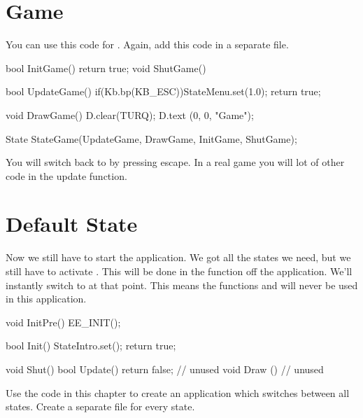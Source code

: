 \section{Game}
You can use this code for . Again, add this code in a separate file.
\begin{code}
bool InitGame() {return true;}
void ShutGame() {}

bool UpdateGame()
{
   if(Kb.bp(KB_ESC))StateMenu.set(1.0);
   return true;
}

void DrawGame()
{
   D.clear(TURQ);
   D.text (0, 0, "Game");
}

State StateGame(UpdateGame, DrawGame, InitGame, ShutGame);
\end{code}

You will switch back to  by pressing escape. In a real game you will lot of other code in the update function.

\section{Default State}
Now we still have to start the application. We got all the states we need, but we still have to activate . This will be done in the  function off the application. We'll instantly switch to  at that point. This means the functions  and  will never be used in this application.

\begin{code}
void InitPre()
{
   EE_INIT();
}

bool Init()
{
   StateIntro.set();
   return true;
}

void Shut() {}
bool Update() {return false;} // unused
void Draw  () {             } // unused
\end{code}

\begin{exercise}
Use the code in this chapter to create an application which switches between all states. Create a separate file for every state.
\end{exercise}